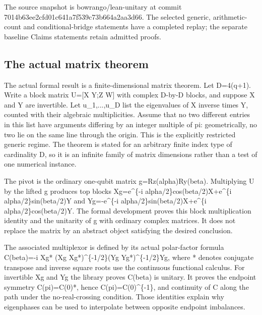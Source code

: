\documentclass[11pt,a4paper]{article}
\begin{document}
\begin{samepage}
The source snapshot is bowrango/lean-unitary at commit 7014b63ee2cfd01c641a7f539c73b664a2aa3d66. The selected generic, arithmetic-count and conditional-bridge statements have a completed replay; the separate baseline Claims statements retain admitted proofs.

\end{samepage}
\subsection{The actual matrix theorem}
The actual formal result is a finite-dimensional matrix theorem. Let D=4(q+1). Write a block matrix U=[X Y;Z W] with complex D-by-D blocks, and suppose X and Y are invertible. Let u\_1,...,u\_D list the eigenvalues of X inverse times Y, counted with their algebraic multiplicities. Assume that no two different entries in this list have arguments differing by an integer multiple of pi: geometrically, no two lie on the same line through the origin. This is the explicitly restricted generic regime. The theorem is stated for an arbitrary finite index type of cardinality D, so it is an infinite family of matrix dimensions rather than a test of one numerical instance.

The pivot is the ordinary one-qubit matrix g=Rz(alpha)Ry(beta). Multiplying U by the lifted g produces top blocks Xg=e\textasciicircum{}\{-i alpha/2\}cos(beta/2)X+e\textasciicircum{}\{i alpha/2\}sin(beta/2)Y and Yg=-e\textasciicircum{}\{-i alpha/2\}sin(beta/2)X+e\textasciicircum{}\{i alpha/2\}cos(beta/2)Y. The formal development proves this block multiplication identity and the unitarity of g with ordinary complex matrices. It does not replace the matrix by an abstract object satisfying the desired conclusion.

The associated multiplexor is defined by its actual polar-factor formula
C(beta)=-i Xg* (Xg Xg*)\textasciicircum{}\{-1/2\}(Yg Yg*)\textasciicircum{}\{-1/2\}Yg,
where * denotes conjugate transpose and inverse square roots use the continuous functional calculus. For invertible Xg and Yg the library proves C(beta) is unitary. It proves the endpoint symmetry C(pi)=C(0)*, hence C(pi)=C(0)\textasciicircum{}\{-1\}, and continuity of C along the path under the no-real-crossing condition. Those identities explain why eigenphases can be used to interpolate between opposite endpoint imbalances.
\end{document}
